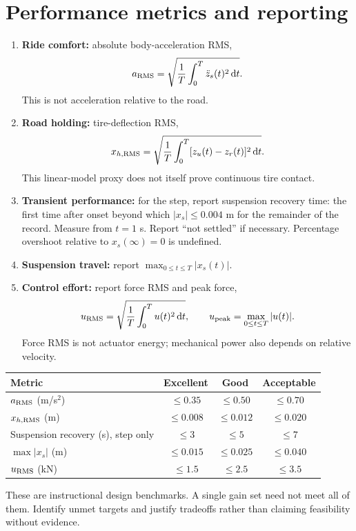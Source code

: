 \section*{Performance metrics and reporting}
\begin{enumerate}
\item \textbf{Ride comfort:} absolute body-acceleration RMS,
\begin{equation}a_{\mathrm{RMS}}=\sqrt{\frac1T\int_0^T\ddot z_s(t)^2\,\mathrm{d} t}.\end{equation}
This is not acceleration relative to the road.
\item \textbf{Road holding:} tire-deflection RMS,
\begin{equation}x_{h,\mathrm{RMS}}=\sqrt{\frac1T\int_0^T[z_u(t)-z_r(t)]^2\,\mathrm{d} t}.\end{equation}
This linear-model proxy does not itself prove continuous tire contact.
\item \textbf{Transient performance:} for the step, report suspension recovery time:
the first time after onset beyond which $|x_s|\leq0.004$ m for the remainder of the
record. Measure from $t=1$ s. Report ``not settled'' if necessary. Percentage
overshoot relative to $x_s(\infty)=0$ is undefined.
\item \textbf{Suspension travel:} report $\max_{0\leq t\leq T}|x_s(t)|$.
\item \textbf{Control effort:} report force RMS and peak force,
\begin{equation}u_{\mathrm{RMS}}=\sqrt{\frac1T\int_0^T u(t)^2\,\mathrm{d} t},\qquad
 u_{\mathrm{peak}}=\max_{0\leq t\leq T}|u(t)|.\end{equation}
Force RMS is not actuator energy; mechanical power also depends on relative velocity.
\end{enumerate}
\begin{center}\begin{tabular}{lccc}\toprule
Metric & Excellent & Good & Acceptable\\\midrule
$a_{\mathrm{RMS}}$ (m/s$^2$) & $\leq0.35$ & $\leq0.50$ & $\leq0.70$\\
$x_{h,\mathrm{RMS}}$ (m) & $\leq0.008$ & $\leq0.012$ & $\leq0.020$\\
Suspension recovery (s), step only & $\leq3$ & $\leq5$ & $\leq7$\\
$\max|x_s|$ (m) & $\leq0.015$ & $\leq0.025$ & $\leq0.040$\\
$u_{\mathrm{RMS}}$ (kN) & $\leq1.5$ & $\leq2.5$ & $\leq3.5$\\\bottomrule
\end{tabular}\end{center}
These are instructional design benchmarks. A single gain set need not meet all of them.
Identify unmet targets and justify tradeoffs rather than claiming feasibility without evidence.

